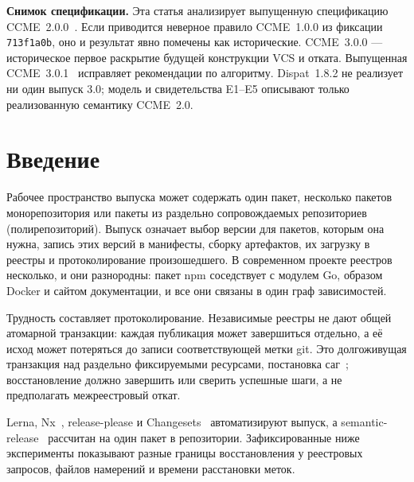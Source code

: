 \documentclass[sigconf,nonacm]{acmart}
\theoremstyle{acmplain}
\theoremstyle{acmdefinition}
\theoremstyle{acmplain}
\newcommand{\code}[1]{\texttt{#1}}
\begin{document}

\maketitle

\noindent\textbf{Снимок спецификации.} Эта статья анализирует выпущенную
спецификацию CCME~2.0.0~\cite{ccme2}. Если приводится неверное правило CCME~1.0.0 из
фиксации \code{713f1a0b}, оно и результат явно помечены как исторические.
CCME~3.0.0 --- историческое первое раскрытие будущей конструкции VCS и отката.
Выпущенная CCME~3.0.1~\cite{ccme301} исправляет рекомендации по алгоритму.
Dispat~1.8.2 не реализует ни один выпуск 3.0; модель и свидетельства E1--E5
описывают только реализованную семантику CCME~2.0.

\section{Введение}
\label{sec:intro}

Рабочее пространство выпуска может содержать один пакет, несколько пакетов
монорепозитория или пакеты из раздельно сопровождаемых репозиториев
(полирепозиторий). Выпуск означает выбор версии для пакетов, которым она нужна,
запись этих версий в манифесты,
сборку артефактов, их загрузку в реестры и протоколирование
произошедшего. В современном проекте реестров несколько, и они
разнородны: пакет npm соседствует с модулем Go, образом Docker и сайтом
документации, и все они связаны в один граф зависимостей.

Трудность составляет протоколирование. Независимые реестры не дают общей
атомарной транзакции: каждая публикация может завершиться отдельно, а её исход
может потеряться до записи соответствующей метки git. Это долгоживущая
транзакция над раздельно фиксируемыми ресурсами, постановка саг~\cite{sagas};
восстановление должно завершить или сверить успешные шаги, а не предполагать
межреестровый откат.

Lerna, Nx~\cite{nx}, release-please и Changesets~\cite{changesets}
автоматизируют выпуск, а semantic-release~\cite{semanticrelease} рассчитан на
один пакет в репозитории. Зафиксированные ниже эксперименты показывают разные
границы восстановления у реестровых запросов, файлов намерений и времени
расстановки меток.
\end{document}
